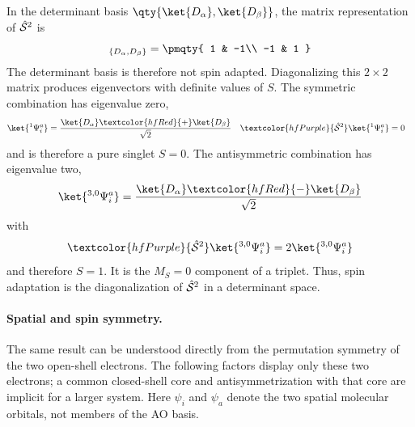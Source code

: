 \documentclass[11pt,a4paper,titlepage]{article}
\numberwithin{equation}{section}
\newcommand{\chS}{\Hat{\mathcal{S}}}
\newcommand{\purple}[1]{\textcolor{hfPurple}{#1}}
\newcommand{\red}[1]{\textcolor{hfRed}{#1}}
\begin{document}
In the determinant basis
$\qty{
  \ket{D_\alpha},
  \ket{D_\beta}
  }$,
the matrix representation of $\chS^2$ is
\begin{equation}
  [\purple{\chS^2}]_{\{D_\alpha,D_\beta\}}
  =
  \pmqty{
    1 & -1\\
    -1 & 1
  }
\end{equation}
The determinant basis is therefore not spin adapted. Diagonalizing this
$2\times2$ matrix produces eigenvectors with definite values of $S$.
The symmetric combination has eigenvalue zero,
\begin{align}
  \ket{{}^1\Psi_i^a}
  &=
  \frac{
    \ket{D_\alpha}
    \red{+}
    \ket{D_\beta}
  }{\sqrt{2}}
  &
  \purple{\chS^2}
  \ket{{}^1\Psi_i^a}
  &=
  0
\end{align}
and is therefore a pure singlet $S=0$.
The antisymmetric combination has eigenvalue two,
\begin{equation}
  \ket{{}^{3,0}\Psi_i^a}
  =
  \frac{
    \ket{D_\alpha}
    \red{-}
    \ket{D_\beta}
  }{\sqrt{2}}
\end{equation}
with
\begin{equation}
  \purple{\chS^2}
  \ket{{}^{3,0}\Psi_i^a}
  =
  2
  \ket{{}^{3,0}\Psi_i^a}
\end{equation}
and therefore $S=1$.
It is the $M_S=0$ component of a triplet.
Thus, spin adaptation is the diagonalization of $\chS^2$ in a determinant space.

\paragraph{Spatial and spin symmetry.}

The same result can be understood directly from the permutation symmetry of
the two open-shell electrons. The following factors display only these two
electrons; a common closed-shell core and antisymmetrization with that core
are implicit for a larger system. Here $\psi_i$ and $\psi_a$ denote the
two spatial molecular orbitals, not members of the AO basis.
\end{document}
